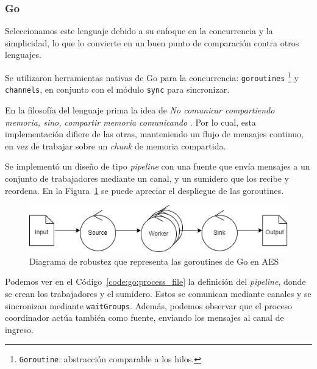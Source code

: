 \documentclass[11pt]{article}
\let\Oldsubsubsection\subsubsection
\renewcommand{\subsubsection}{\FloatBarrier\Oldsubsubsection}
\newcommand{\english}[1]{\textit{#1}}
\newcommand{\technical}[1]{\textit{#1}}
\begin{document}
\subsubsection{Go}

Seleccionamos este lenguaje debido a su enfoque en la concurrencia \cite{go:ex:concurrency_patterns} y la simplicidad, lo que lo convierte en un buen punto de comparación contra otros lenguajes.

Se utilizaron herramientas nativas de Go para la concurrencia: \lstinline{goroutines} \footnote{ \lstinline{Goroutine}: abstracción comparable a los hilos.} y \lstinline{channels}, en conjunto con el módulo \lstinline{sync} para sincronizar.

En la filosofía del lenguaje prima la idea de \technical{No comunicar compartiendo memoria, sino, compartir memoria comunicando} \cite{go:ex:sharing}. Por lo cual, esta implementación difiere de las otras, manteniendo un flujo de mensajes continuo, en vez de trabajar sobre un \english{chunk} de memoria compartida.

Se implementó un diseño de tipo \english{pipeline} con una fuente que envía mensajes a un conjunto de trabajadores mediante un canal, y un sumidero que los recibe y reordena. En la Figura~\ref{fig:go:robustness} se puede apreciar el despliegue de las goroutines.

\begin{figure}[h]
    \centering
    \includegraphics[scale=0.7]{resources/aes/go_robustness.png}
    \caption{Diagrama de robustez que representa las goroutines de Go en AES}
    \label{fig:go:robustness}
\end{figure}

Podemos ver en el Código~\ref{code:go:process_file} la definición del \english{pipeline}, donde se crean los trabajadores y el sumidero. Estos se comunican mediante canales y se sincronizan mediante \lstinline{waitGroups}. Además, podemos observar que el proceso coordinador actúa también como fuente, enviando los mensajes al canal de ingreso.
\end{document}
